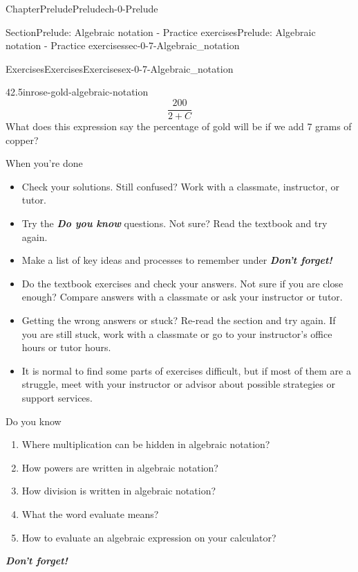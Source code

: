 \documentclass[twoside,11pt,]{book}
\newcommand{\alert}[1]{\textbf{\textit{#1}}}
\numberwithin{equation}{section}
\begin{document}
\begin{chapterptx}{Chapter}{Prelude}{}{Prelude}{}{}{ch-0-Prelude}
\begin{sectionptx}{Section}{Prelude: Algebraic notation - Practice exercises}{}{Prelude: Algebraic notation - Practice exercises}{}{}{sec-0-7-Algebraic_notation}
\begin{exercises-subsection-numberless}{Exercises}{Exercises}{}{Exercises}{}{}{ex-0-7-Algebraic_notation}
\begin{divisionexercise}{4}{}{2.5in}{rose-gold-algebraic-notation}
\begin{equation*}
\frac{200}{2 +C}
\end{equation*}
What does this expression say the percentage of gold will be if we add 7 grams of copper?%
\end{divisionexercise}%
\end{exercises-subsection-numberless}
\begin{conclusion}{When you're done \textellipsis{}}%
%
\begin{itemize}[label=\textbullet]
\item{}Check your solutions. Still confused? Work with a classmate, instructor, or tutor.%
\item{}Try the \alert{Do you know} questions. Not sure? Read the textbook and try again.%
\item{}Make a list of key ideas and processes to remember under \alert{Don't forget!}%
\item{}Do the textbook exercises and check your answers. Not sure if you are close enough? Compare answers with a classmate or ask your instructor or tutor.%
\item{}Getting the wrong answers or stuck? Re-read the section and try again. If you are still stuck, work with a classmate or go to your instructor's office hours or tutor hours.%
\item{}It is normal to find some parts of exercises difficult, but if most of them are a struggle, meet with your instructor or advisor about possible strategies or support services.%
\end{itemize}
%
\end{conclusion}%
\begin{conclusion}{Do you know \textellipsis{}}%
%
\begin{enumerate}[label={\Alph*.}]
\item{}Where multiplication can be hidden in algebraic notation?%
\item{}How powers are written in algebraic notation?%
\item{}How division is written in algebraic notation?%
\item{}What the word evaluate means?%
\item{}How to evaluate an algebraic expression on your calculator?%
\end{enumerate}
%
\par
\alert{Don't forget!}%
\end{conclusion}%
\end{sectionptx}
%
%
\typeout{************************************************}

\end{chapterptx}
\end{document}
